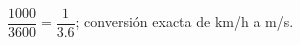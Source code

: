 \documentclass[preview]{standalone}
\begin{document}
\begin{center}
\small $\dfrac{1000}{3600}=\dfrac{1}{3.6}$; conversión exacta de km/h a m/s.
\end{center}
\end{document}
